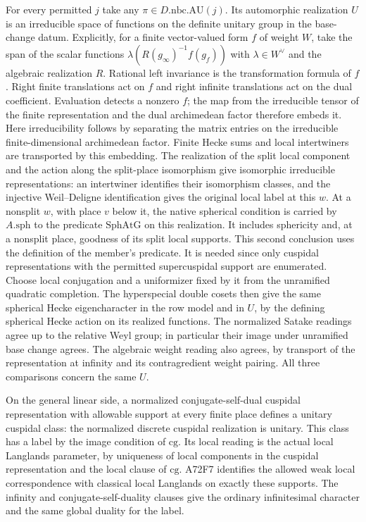 For every permitted $j$ take any $\pi\in D.\mathrm{nbc}.\mathrm{AU}(j)$.
Its automorphic realization $U$ is an irreducible space of functions
on the definite unitary group in the base-change datum. Explicitly,
for a finite vector-valued form $f$ of weight $W$, take the span
of the scalar functions $\lambda(R(g_\infty)^{-1}f(g_f))$ with
$\lambda\in W^\vee$ and the algebraic realization $R$. Rational
left invariance is the transformation formula of $f$. Right finite
translations act on $f$ and right infinite translations act on the
dual coefficient. Evaluation detects a nonzero $f$; the map from the
irreducible tensor of the finite representation and the dual
archimedean factor therefore embeds it. Here irreducibility follows
by separating the matrix entries on the irreducible finite-dimensional
archimedean factor. Finite Hecke sums and local intertwiners are
transported by this embedding. The
realization of the split local component and the action along the
split-place isomorphism give isomorphic irreducible representations:
an intertwiner identifies their isomorphism classes, and the
injective Weil--Deligne identification gives the original local
label at this $w$. At a nonsplit $w$, with place $v$ below it,
the native spherical condition is carried by $A.\mathrm{sph}$ to
the predicate $\mathrm{SphAtG}$ on this realization. It includes
sphericity and, at a nonsplit place, goodness of its split local
supports. This second conclusion uses the definition of the member's
predicate. It is needed since only cuspidal representations with
the permitted supercuspidal support are enumerated. Choose local
conjugation and a uniformizer fixed by it from the unramified
quadratic completion. The hyperspecial double cosets then give
the same spherical Hecke eigencharacter in the row model and in
$U$, by the defining spherical Hecke action on its realized
functions. The normalized Satake readings agree up to the relative
Weyl group; in particular their image under unramified base change
agrees. The algebraic weight reading also agrees, by transport of
the representation at infinity and its contragredient weight pairing.
All three comparisons concern the same $U$.

On the general linear side, a normalized conjugate-self-dual
cuspidal representation with allowable support at every finite
place defines a unitary cuspidal class: the normalized discrete
cuspidal realization is unitary. This class has a label by the
image condition of $\mathrm{cg}$. Its local reading is the actual
local Langlands parameter, by uniqueness of local components in
the cuspidal representation and the local clause of $\mathrm{cg}$. A72F7 identifies the allowed
weak local correspondence with classical local Langlands on exactly
these supports.
The infinity and conjugate-self-duality clauses give the ordinary
infinitesimal character and the same global duality for the label.

